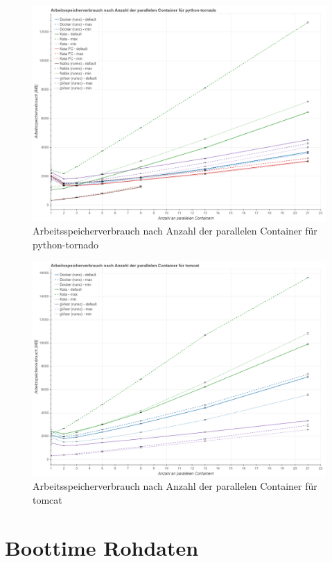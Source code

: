\begin{figure}[h]
	\centering
	\includegraphics[width=0.96\linewidth]{gfx/auswertung/ram_python.png}
	\caption{Arbeitsspeicherverbrauch nach Anzahl der parallelen Container für python-tornado} 
	\label{fig:ram_python}
\end{figure}
\newpage
\begin{figure}[h]
	\centering
	\includegraphics[width=0.96\linewidth]{gfx/auswertung/ram_tomcat.png}
	\caption{Arbeitsspeicherverbrauch nach Anzahl der parallelen Container für tomcat} 
	\label{fig:ram_tomcat}
\end{figure}
\newpage

\section{Boottime Rohdaten}

